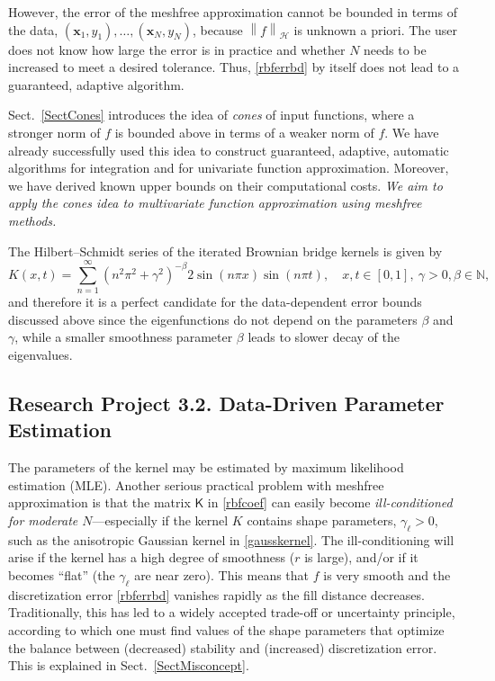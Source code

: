 \documentclass[11pt]{NSFamsart}
\newcommand{\mK}{\mathsf{K}}
\newcommand{\bx}{{\boldsymbol{x}}}
\newcommand{\norm}[2][{}]{\ensuremath{\left \lVert #2 \right \rVert}_{#1}}
\newcommand{\ch}{\mathcal{H}}
\begin{document}
However, the error of the meshfree approximation cannot be bounded in terms of the data, $(\bx_1, y_1), \ldots, (\bx_N,y_N)$, because $\norm[\ch]{f}$ is unknown a priori.  The user does not know how large the error is in practice and whether $N$ needs to be increased to meet a desired tolerance. Thus, \eqref{rbferrbd} by itself does not lead to a guaranteed, adaptive algorithm.

Sect.\ \ref{SectCones} introduces the idea of \emph{cones} of input functions, where a stronger norm of $f$ is bounded above in terms of a weaker norm of $f$.  We have already successfully used this idea to construct guaranteed, adaptive, automatic algorithms for integration and for univariate function approximation.  Moreover, we have derived known upper bounds on their computational costs. \emph{We aim to apply the cones idea to multivariate function approximation using meshfree methods.}

The Hilbert--Schmidt series of the iterated Brownian bridge kernels \citep{CavorettoEtAl14} is given by
\begin{equation}\label{IBBkernel}
K(x,t) = \sum_{n=1}^{\infty} \left(n^2\pi^2 + \gamma^2\right)^{-\beta} 2\sin(n\pi x) \sin(n\pi t), \quad x,t \in [0,1],\ \gamma>0, \beta \in \mathbb{N},
\end{equation}
and therefore it is a perfect candidate for the data-dependent error bounds discussed above since the eigenfunctions do not depend on the parameters $\beta$ and $\gamma$, while a smaller smoothness parameter $\beta$ leads to slower decay of the eigenvalues.

\subsection*{Research Project 3.2. Data-Driven Parameter Estimation} \label{parestsubsec}
The parameters of the kernel may be estimated by maximum likelihood estimation (MLE).  Another serious practical problem with meshfree approximation is that the matrix $\mK$ in \eqref{rbfcoef} can easily become \emph{ill-conditioned for moderate $N$}---especially if the kernel $K$ contains shape parameters, $\gamma_\ell>0$, such as the anisotropic Gaussian kernel in \eqref{gausskernel}.  The ill-conditioning will arise if the kernel has a high degree of smoothness ($r$ is large), and/or if it becomes ``flat'' (the $\gamma_\ell$ are near zero). This means that $f$ is very smooth and the discretization error \eqref{rbferrbd} vanishes rapidly as the fill distance decreases.
Traditionally, this has led to a widely accepted trade-off or uncertainty principle, according to which one must find values of the shape parameters that optimize the balance between (decreased) stability and (increased) discretization error.  This is explained in Sect.\ \ref{SectMisconcept}.
\end{document}
